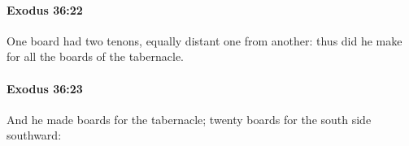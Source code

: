 		\paragraph{Exodus 36:22} %
			\label{EXODUS-36-22}

			One board had two tenons, equally distant one from another: thus did he make for all the boards of the tabernacle.


		\paragraph{Exodus 36:23} %
			\label{EXODUS-36-23}

			And he made boards for the tabernacle; twenty boards for the south side southward:


